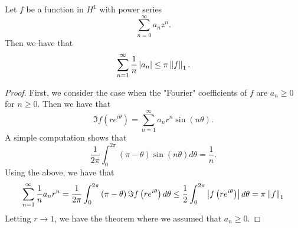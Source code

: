 \begin{theorem}[Hardy]
    Let $f$ be a function in $H^{1}$ with power series
    \begin{equation*}
	\sum_{n=0}^{\infty} a_{n} z^{n}.
    \end{equation*}
    Then we have that
    \begin{equation*}
	\sum_{n=1}^{\infty} \frac{1}{n} \left\lvert a_{n} \right\rvert \le \pi \left\lVert f \right\rVert_{1}.
    \end{equation*}
    \label{thm:hardy-inequality}
\end{theorem}
\begin{proof}
    First, we consider the case when the "Fourier" coefficients of $f$ are $a_{n} \ge 0$ for $n\ge 0$. Then we have that 
    \begin{equation*}
	\Im f\left( re^{i\theta} \right) = \sum_{n=1}^{\infty} a_{n} r^{n} \sin \left( n\theta \right).
    \end{equation*}
    A simple computation shows that 
    \begin{equation*}
	\frac{1}{2\pi} \int_{0}^{2\pi} \left( \pi-\theta \right) \sin \left( n\theta \right) d\theta = \frac{1}{n}.
    \end{equation*}
    Using the above, we have that
    \begin{equation*}
	\sum_{n=1}^{\infty} \frac{1}{n}a_{n}r^{n} = \frac{1}{2\pi} \int_{0}^{2\pi} \left( \pi-\theta \right) \Im f\left( re^{i\theta} \right) d\theta \le \frac{1}{2} \int_{0}^{2\pi} \left\lvert f\left( re^{i\theta} \right) \right\rvert d\theta = \pi \left\lVert f \right\rVert_{1}
    \end{equation*}
    Letting $r \to 1$, we have the theorem where we assumed that $a_{n} \ge 0$.


\end{proof}
